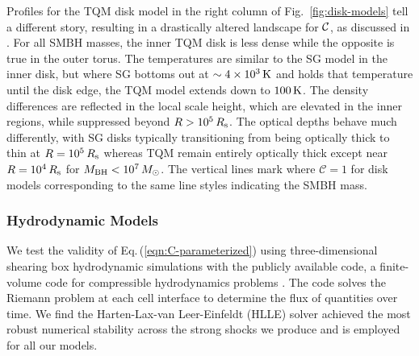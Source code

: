 Profiles for the TQM disk model in the right column of Fig.~\ref{fig:disk-models} tell a different story, resulting in a drastically altered landscape for $\mathcal{C}$, as discussed in .
For all SMBH masses, the inner TQM disk is less dense while the opposite is true in the outer torus.
The temperatures are similar to the SG model in the inner disk, but where SG bottoms out at $\sim 4 \times 10^3\,\rm{K}$ and holds that temperature until the disk edge, the TQM model extends down to $100\,\rm{K}$.
The density differences are reflected in the local scale height, which are elevated in the inner regions, while suppressed beyond $R>10^5\,R_{\rm s}$.
The optical depths behave much differently, with SG disks typically transitioning from being optically thick to thin at $R=10^5\,R_{\rm s}$ whereas TQM remain entirely optically thick except near $R=10^4\,R_{\rm s}$ for $M_{\rm BH}<10^7\,M_{\odot}$.
The vertical lines mark where $\mathcal{C}=1$ for disk models corresponding to the same line styles indicating the SMBH mass.


\subsubsection{Hydrodynamic Models}
\label{sec:hydro}

We test the validity of Eq.\,(\ref{eqn:C-parameterized}) using three-dimensional shearing box hydrodynamic simulations with the publicly available  code, a finite-volume code for compressible hydrodynamics problems \citep{Stone+08, StoneGardiner10}.
The code solves the Riemann problem at each cell interface to determine the flux of quantities over time.
We find the Harten-Lax-van Leer-Einfeldt (HLLE) solver \citep{Einfeldt+91} achieved the most robust numerical stability across the strong shocks we produce and is employed for all our models.

